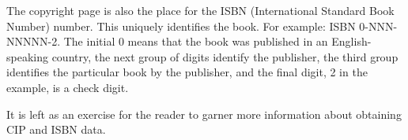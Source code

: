 \documentclass[10pt,a4paper,oneside,extrafontsizes]{memoir}%
\begin{document}
\begin{paracol}{2}
    The copyright page is also the place for the ISBN 
(International
Standard Book Number) number. This uniquely identifies the book. For example:
ISBN 0-NNN-NNNNN-2. The initial 0 means that the book was published in an
English-speaking country, the next group of digits identify the publisher,
the third group identifies the particular book by the publisher, and the final
digit, 2 in the example, is a check digit.

    It is left as an exercise for the reader to garner more information about
obtaining CIP and ISBN data.
\end{paracol}

\section{\prMainmatter}
\end{document}
